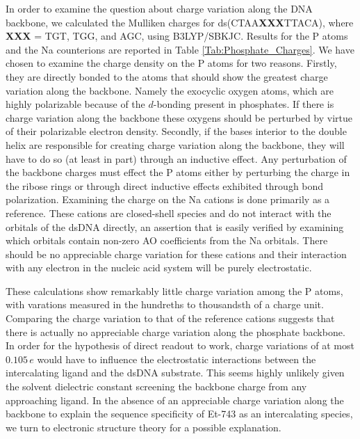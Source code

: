 In order to examine the question about charge variation along the DNA
backbone, we calculated the Mulliken charges for
ds(CTAA\textbf{XXX}TTACA), where \textbf{XXX} = TGT, TGG, and AGC,
using B3LYP/SBKJC.  Results for the P atoms and the Na counterions are
reported in Table \ref{Tab:Phosphate_Charges}.    We
have chosen to examine the charge density on the P atoms for two
reasons.  Firstly, they are directly bonded to the atoms that should
show the greatest charge variation along the backbone.  Namely the
exocyclic oxygen atoms, which are highly polarizable because of the
$d$-bonding present in phosphates.  If there is charge variation along
the backbone these oxygens should be perturbed by virtue of their
polarizable electron density.  Secondly, if the bases interior to the
double helix are responsible for creating charge variation along the
backbone, they will have to do so (at least in part) through an
inductive effect.  Any perturbation of the backbone charges must
effect the P atoms either by perturbing the charge in the ribose rings
or through direct inductive effects exhibited through bond
polarization.  Examining the charge on the Na cations is done
primarily as a reference.  These cations are closed-shell species and
do not interact with the orbitals of the dsDNA directly, an assertion
that is easily verified by examining which orbitals contain non-zero
AO coefficients from the Na orbitals.  There should be no appreciable
charge variation for these cations and their interaction with any
electron in the nucleic acid system will be purely electrostatic.

These calculations show remarkably little charge variation among the P
atoms, with varations measured in the hundreths to thousandsth of a
charge unit.  Comparing the charge variation to that of the reference
cations suggests that there is actually no appreciable charge
variation along the phosphate backbone.  In order for the hypothesis
of direct readout to work, charge variations of at most $0.105\,e$
would have to influence the electrostatic interactions between the
intercalating ligand and the dsDNA substrate.  This seems highly
unlikely given the solvent dielectric constant screening the backbone
charge from any approaching ligand.  In the absence of an appreciable
charge variation along the backbone to explain the sequence
specificity of Et-743 as an intercalating species, we turn to
electronic structure theory for a possible explanation.









